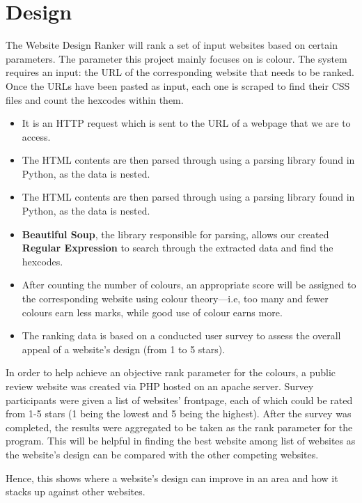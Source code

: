 \documentclass{fisatproject}
\begin{document}
\section{Design}
The Website Design Ranker will rank a set of input websites based on certain parameters. The parameter this project mainly focuses on is colour.
The system requires an input: the URL of the corresponding website that needs to be ranked. Once the URLs have been pasted as input, each one is scraped to find their CSS files and count the hexcodes within them.
\begin{itemize}
	\item It is an HTTP request which is sent to the URL of a webpage that we
	are to access.
	\item The HTML contents are then parsed through using a parsing library
	found in Python, as the data is nested.
	\item The HTML contents are then parsed through using a parsing library
	found in Python, as the data is nested.
	\item \textbf{Beautiful Soup}, the library responsible for parsing, allows our created
	\textbf{Regular Expression} to search through the extracted data and find
	the hexcodes.
	\item After counting the number of colours, an appropriate score will be
	assigned to the corresponding website using colour theory—i.e, too many
	and fewer colours earn less marks, while good use of colour earns more.
	\item The ranking data is based on a conducted user survey to assess the
	overall appeal of a website’s design (from 1 to 5 stars).
\end{itemize}

In order to help achieve an objective rank parameter for the colours, a public review website was created via PHP hosted on an apache server. Survey participants were given a list of websites' frontpage, each of which could be rated from 1-5 stars (1 being the lowest and 5 being the highest).
After the survey was completed, the results were aggregated to be taken as the rank parameter for the program.
This will be helpful in finding the best website among list of websites as the website's design can be compared with the other competing websites.

Hence, this shows where a  website’s design can improve in an area and how it stacks up against other websites.
\end{document}

